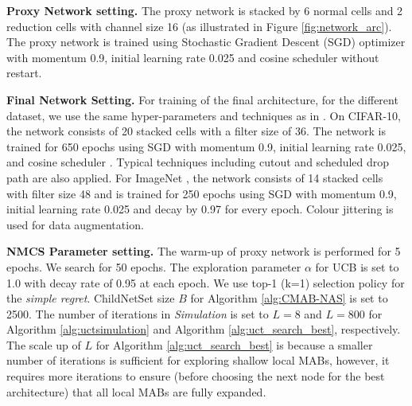 \documentclass[conference]{IEEEtran}
\begin{document}
\noindent\textbf{Proxy Network setting.} The proxy network is stacked by 6 normal cells and 2 reduction cells with channel size 16 (as illustrated in Figure \ref{fig:network_arc}). The proxy network is trained using Stochastic Gradient Descent (SGD) optimizer with momentum 0.9, initial learning rate 0.025 and cosine scheduler \cite{loshchilov2016sgdr} without restart.

\noindent\textbf{Final Network Setting.}
For training of the final architecture, for the different dataset, we use the same hyper-parameters and techniques as in \cite{liu2018darts}. On CIFAR-10, the network consists of 20 stacked cells with a filter size of 36. The network is trained for 650 epochs using SGD with momentum 0.9, initial learning rate 0.025, and cosine scheduler \cite{loshchilov2016sgdr}. Typical techniques including cutout \cite{devries2017improved} and scheduled drop path are also applied. For ImageNet \cite{imagenet_cvpr09}, the network consists of 14 stacked cells with filter size 48 and is trained for 250 epochs using SGD with momentum 0.9, initial learning rate 0.025 and decay by 0.97 for every epoch. Colour jittering is used for data augmentation.

\noindent\textbf{NMCS Parameter setting.} 
The warm-up of proxy network is performed for 5 epochs. We search for 50 epochs. The exploration parameter $\alpha$ for UCB is set to 1.0 with decay rate of 0.95 at each epoch. We use top-1 (k=1) selection policy for the \emph{simple regret}. ChildNetSet size $B$ for Algorithm \ref{alg:CMAB-NAS} is set to 2500. The number of iterations in \emph{Simulation} is set to $L=8$ and $L=800$ for Algorithm \ref{alg:uctsimulation} and Algorithm \ref{alg:uct_search_best}, respectively. The scale up of $L$ for Algorithm \ref{alg:uct_search_best} is because a smaller number of iterations is sufficient for exploring shallow local MABs, however, it requires more iterations to ensure (before choosing the next node for the best architecture) that all local MABs are fully expanded.


\end{document}
